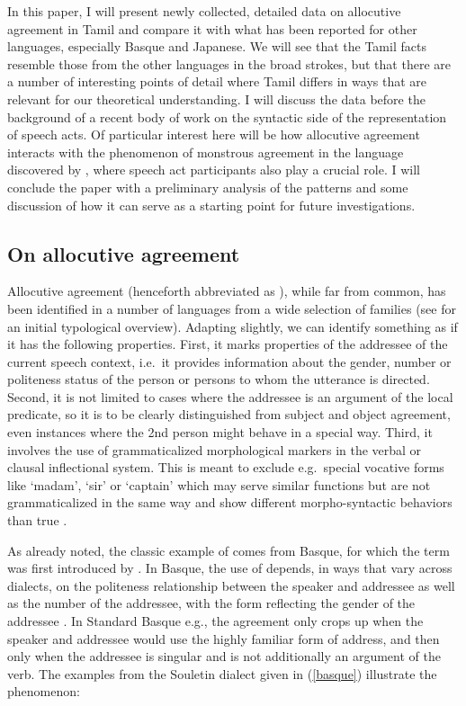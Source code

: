 \documentclass[output=paper, modfonts, nonflat]{langsci/langscibook}
\begin{document}
In this paper, I will present newly collected, detailed data on
allocutive agreement in Tamil and compare it with what has been
reported for other languages, especially Basque and Japanese. We will
see that the Tamil facts resemble those from the other languages in
the broad strokes, but that there are a number of interesting points
of detail where Tamil differs in ways that are relevant for our
theoretical understanding. I will discuss the data before the
background of a recent body of work on the syntactic side of the
representation of speech acts. Of particular interest here will be how
allocutive agreement interacts with the phenomenon of monstrous
agreement in the language discovered by \citet{sundaresan:diss}, where
speech act participants also play a crucial role. I will conclude the
paper with a preliminary analysis of the patterns and some discussion
of how it can serve as a starting point for future investigations.


\subsection{On allocutive agreement}
\label{sec:backallagr}

Allocutive agreement (henceforth abbreviated as \allagr), while far
from common, has been identified in a number of languages from a wide
selection of families (see \citealt{antonov:2015} for an initial typological
overview). Adapting \citet{antonov:2015} slightly, we
can identify something as \allagr{} if it has the following
properties. First, it marks properties of the addressee of the current
speech context, i.e.\ it provides information about the gender, number
or politeness status of the person or persons to whom the utterance is
directed. Second, it is not limited to cases where the addressee is an
argument of the local predicate, so it is to be clearly distinguished
from subject and object agreement, even instances where the 2nd person
might behave in a special way. Third, it involves the use of
grammaticalized morphological markers in the verbal or clausal
inflectional system. This is meant to exclude e.g.\ special vocative
forms like `madam', `sir' or `captain' which may serve similar
functions but are not grammaticalized in the same way and show
different morpho-syntactic behaviors than true \allagr.

As already noted, the classic example of \allagr{} comes from Basque,
for which the term was first introduced by \citet{bonaparte:1862}. In
Basque, the use of \allagr{} depends, in ways that vary across
dialects, on the politeness relationship between the speaker and
addressee as well as the number of the addressee, with the form
reflecting the gender of the addressee \citep[see also][ch.\
5]{oyharcabal:1993, alcazarsaltarelli:2014}. In Standard Basque e.g.,
the agreement only crops up when the speaker and addressee would use
the highly familiar form of address, and then only when the addressee
is singular and is not additionally an argument of the verb. The
examples from the Souletin dialect given in (\ref{basque})
\citep[reported by][]{antonov:2015} illustrate the phenomenon:
\end{document}
